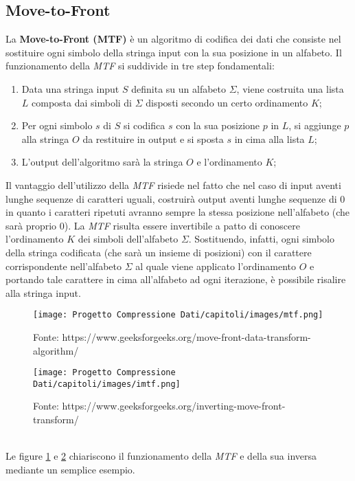 \begin{enumerate}
\subsection{Move-to-Front} 
La \textbf{Move-to-Front (MTF)} è un algoritmo di codifica dei dati che consiste nel sostituire ogni simbolo della stringa input con la sua posizione in un alfabeto. Il funzionamento della \emph{MTF} si suddivide in tre step fondamentali:
\begin{enumerate}
    \item Data una stringa input $S$ definita su un alfabeto $\Sigma$, viene costruita una lista $L$ composta dai simboli di $\Sigma$ disposti secondo un certo ordinamento $K$;
    \item Per ogni simbolo $s$ di $S$ si codifica $s$ con la sua posizione $p$ in $L$, si aggiunge $p$ alla stringa $O$ da restituire in output e si sposta $s$ in cima alla lista $L$;
    \item L'output dell'algoritmo sarà la stringa $O$ e l'ordinamento $K$;
\end{enumerate}
Il vantaggio dell'utilizzo della \emph{MTF} risiede nel fatto che nel caso di input aventi lunghe sequenze di caratteri uguali, costruirà output aventi lunghe sequenze di $0$ in quanto i caratteri ripetuti avranno sempre la stessa posizione nell'alfabeto (che sarà proprio 0). La \emph{MTF} risulta essere invertibile a patto di conoscere l'ordinamento $K$ dei simboli dell'alfabeto $\Sigma$. Sostituendo, infatti, ogni simbolo della stringa codificata (che sarà un insieme di posizioni) con il carattere corrispondente nell'alfabeto $\Sigma$ al quale viene applicato l'ordinamento $O$ e portando tale carattere in cima all'alfabeto ad ogni iterazione, è possibile risalire alla stringa input. 
\begin{figure}[h]
    \centering
    \texttt{[image: Progetto Compressione Dati/capitoli/images/mtf.png]}
\caption{Fonte: https://www.geeksforgeeks.org/move-front-data-transform-algorithm/}
    \label{fig:mtf}
\end{figure}
\begin{figure}[h]
    \centering
    \texttt{[image: Progetto Compressione Dati/capitoli/images/imtf.png]}
\caption{Fonte: https://www.geeksforgeeks.org/inverting-move-front-transform/}
    \label{fig:imtf}
\end{figure} \\
Le figure \ref{fig:mtf} e \ref{fig:imtf} chiariscono il funzionamento della \emph{MTF} e della sua inversa mediante un semplice esempio. 


\end{enumerate}
